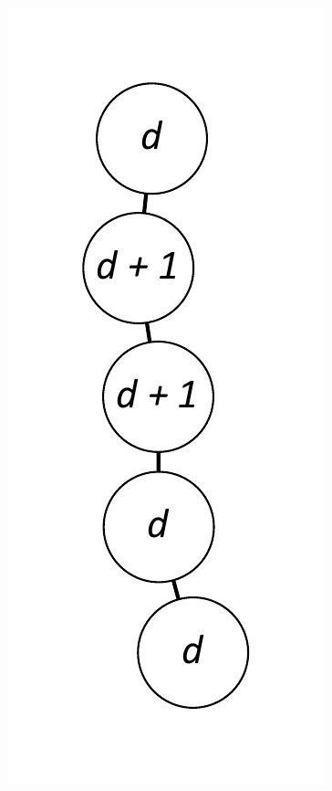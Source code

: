 \documentclass[12pt]{article}
\theoremstyle{plain}
\theoremstyle{definition}
\theoremstyle{remark}
\begin{document}
\begin{figure}[!htb]
\includegraphics[scale=0.25]{Superabundance/MaxDegree3Trees/0101011000[2,3,1,1,3].pdf}

\end{figure}
\end{document}
